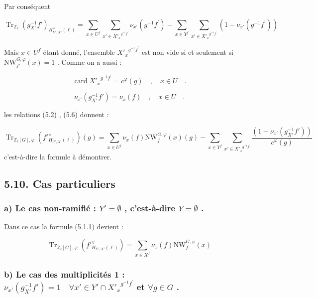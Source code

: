 \documentclass[11pt]{article}
\providecommand{\Tr}{\operatorname{Tr}}
\providecommand{\Tr}{\operatorname{Tr}}
\providecommand{\Tr}{\operatorname{Tr}}
\providecommand{\Tr}{\operatorname{Tr}}
\providecommand{\bZ}{\mathbb Z}
\providecommand{\card}{\operatorname{card}}
\providecommand{\Tr}{\operatorname{Tr}}
\begin{document}
Par conséquent

\begin{equation}\tag{5.6}
\Tr_{\bZ_\ell}(g^{-1}_{X'}f')_{H^\vee_{U',X'}(\ell)} = \sum_{x \in U^f} \sum_{x' \in {X'_x}^{g^{-1}f^{\prime}}} \nu_{x'}(g^{-1}f^{\prime}) - \sum_{x \in Y^f} \sum_{x' \in {X'_x}^{g^{-1}f^{\prime}}} (1 - \nu_{x'}(g^{-1}f^{\prime}))
\end{equation}

Mais $x \in U^f$ étant donné, l'ensemble ${X'_x}^{g^{-1}f^{\prime}}$ est non vide si et seulement si $\mathrm{NW}_{f'}^{G,\varphi}(x) = 1$ . Comme on a aussi :

\begin{equation}\tag{5.7}
\card {X'_x}^{g^{-1}f^{\prime}} = c^\varphi(g) \quad , \quad x \in U \quad .
\end{equation}

\begin{equation}\tag{5.8}
\nu_{x'}(g^{-1}_{X'}f') = \nu_x(f) \quad , \quad x \in U \quad .
\end{equation}

les relations (5.2) , (5.6) donnent :

\begin{equation}\tag{5.9}
\Tr_{\bZ_\ell[G],\varphi}(f'^\vee_{H_{U',X'}(\ell)})(g) = \sum_{x \in U^f} \nu_x(f) \mathrm{NW}_f^{G,\varphi}(x)(g) - \sum_{x \in Y^f} \sum_{x' \in {X'_x}^{g^{-1}f^{\prime}}} \frac{(1 - \nu_{x'}(g^{-1}_{X'}f'))}{c^\varphi(g)}
\end{equation}
c'est-à-dire la formule à démontrer.

\subsection*{5.10. Cas particuliers}
\subsubsection*{a) Le cas non-ramifié : $Y' = \emptyset$ , c'est-à-dire $Y = \emptyset$ .}

Dans ce cas la formule (5.1.1) devient :

\begin{equation}\tag{5.11}
\Tr_{\bZ_\ell[G],\varphi}(f'^\vee_{H_{U',X'}(\ell)}) = \sum_{x \in X^f} \nu_x(f) \mathrm{NW}_f^{G,\varphi}(x)
\end{equation}

\subsubsection*{b) Le cas des multiplicités 1 : $\nu_{x'}(g^{-1}_{X'}f') = 1 \quad \forall x' \in Y' \cap {X'_x}^{g^{-1}f^{\prime}}$ et $\forall g \in G$ .}
\end{document}
